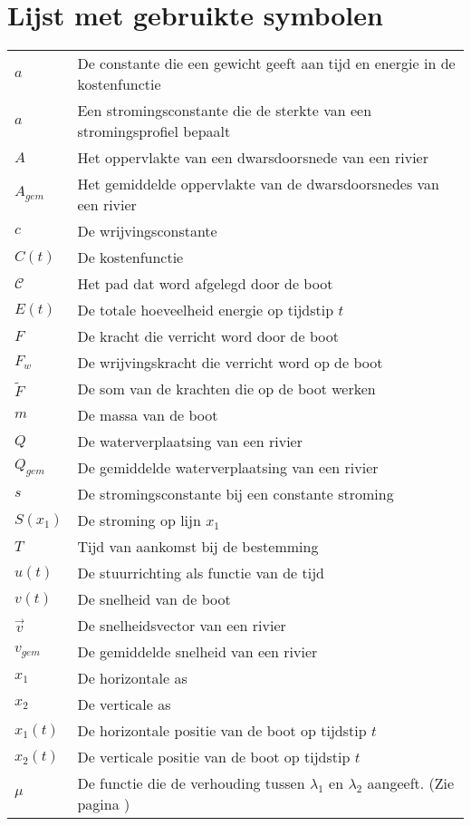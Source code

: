 \chapter*{Lijst met gebruikte symbolen}
\begin{tabular}{ l l }
	\(a\) & De constante die een gewicht geeft aan tijd en energie in de kostenfunctie\\
	\(a\) & Een stromingsconstante die de sterkte van een stromingsprofiel bepaalt\\
	\(A\) & Het oppervlakte van een dwarsdoorsnede van een rivier\\
	\(A_{gem}\) & Het gemiddelde oppervlakte van de dwarsdoorsnedes van een rivier\\
	\(c\) & De wrijvingsconstante\\
	\(C(t)\) & De kostenfunctie\\
	\(\mathcal{C}\) & Het pad dat word afgelegd door de boot\\
	\(E(t)\) & De totale hoeveelheid energie op tijdstip \(t\)\\
	\(F\) & De kracht die verricht word door de boot\\
	\(F_w\) & De wrijvingskracht die verricht word op de boot\\
	\(\widetilde{F}\) & De som van de krachten die op de boot werken\\
	\(m\) & De massa van de boot\\
	\(Q\) & De waterverplaatsing van een rivier \\
	\(Q_{gem}\) & De gemiddelde waterverplaatsing van een rivier\\
	\(s\) & De stromingsconstante bij een constante stroming\\
	\(S(x_1)\) & De stroming op lijn \(x_1\)\\
	\(T\) & Tijd van aankomst bij de bestemming\\
	\(u(t)\) &	De stuurrichting als functie van de tijd\\
	\(v(t)\) & De snelheid van de boot\\
	\(\overrightarrow{v}\) & De snelheidsvector van een rivier\\
	\(v_{gem}\) & De gemiddelde snelheid van een rivier\\
	\(x_1\) & De horizontale as\\
	\(x_2\) & De verticale as\\
	\(x_1(t)\) & De horizontale positie van de boot op tijdstip \(t\)\\
	\(x_2(t)\) & De verticale positie van de boot op tijdstip \(t\)\\
	\(\mu\) & De functie die de verhouding tussen \(\lambda_1\) en \(\lambda_2\) aangeeft. (Zie pagina \pageref{mu})
\end{tabular}
